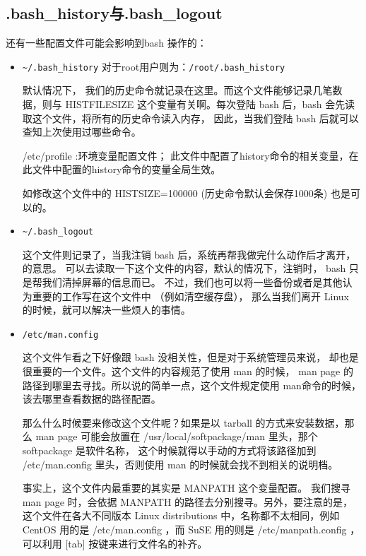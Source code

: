\subsection{.bash\_history与.bash\_logout}
还有一些配置文件可能会影响到bash 操作的：
\begin{itemize}
\item \verb|~/.bash_history|
对于root用户则为：\verb|/root/.bash_history|

\qquad 默认情况下， 我们的历史命令就记录在这里。而这个文件能够记录几笔数据，则与 HISTFILESIZE 这个变量有关啊。每次登陆 bash 后，bash 会先读取这个文件，将所有的历史命令读入内存， 因此，当我们登陆 bash 后就可以查知上次使用过哪些命令。

/etc/profile :环境变量配置文件；
此文件中配置了history命令的相关变量，在此文件中配置的history命令的变量全局生效。

如修改这个文件中的 HISTSIZE=100000 (历史命令默认会保存1000条) 也是可以的。


\item \verb|~/.bash_logout|

\qquad 这个文件则记录了，当我注销 bash 后，系统再帮我做完什么动作后才离开，的意思。 可以去读取一下这个文件的内容，默认的情况下，注销时， bash 只是帮我们清掉屏幕的信息而已。 不过，我们也可以将一些备份或者是其他认为重要的工作写在这个文件中 （例如清空缓存盘）， 那么当我们离开 Linux 的时候，就可以解决一些烦人的事情。

\item \verb|/etc/man.config|

\qquad 这个文件乍看之下好像跟 bash 没相关性，但是对于系统管理员来说， 却也是很重要的一个文件。这个文件的内容规范了使用 man 的时候， man page 的路径到哪里去寻找。所以说的简单一点，这个文件规定使用 man命令的时候，该去哪里查看数据的路径配置。

\qquad 那么什么时候要来修改这个文件呢？如果是以 tarball 的方式来安装数据，那么 man page 可能会放置在 /usr/local/softpackage/man 里头，那个 softpackage 是软件名称， 这个时候就得以手动的方式将该路径加到 /etc/man.config 里头，否则使用 man 的时候就会找不到相关的说明档。

\qquad 事实上，这个文件内最重要的其实是 MANPATH 这个变量配置。 我们搜寻 man page 时，会依据 MANPATH 的路径去分别搜寻。另外，要注意的是， 这个文件在各大不同版本 Linux distributions 中，名称都不太相同，例如 CentOS 用的是 /etc/man.config ，而 SuSE 用的则是 /etc/manpath.config ， 可以利用 [tab] 按键来进行文件名的补齐。
\end{itemize}


